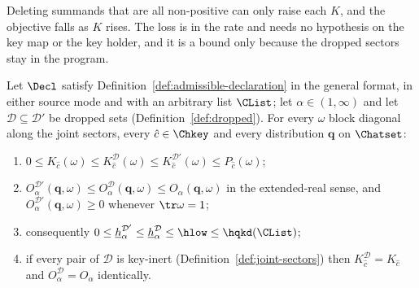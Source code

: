 
Deleting summands that are all non-positive can only raise each $K$, and
the objective falls as $K$ rises. The loss is in the rate and needs no
hypothesis on the key map or the key holder, and it is a bound only because
the dropped sectors stay in the program.

\begin{proposition}\label{prop:drop-bound}
Let $\Decl$ satisfy Definition~\ref{def:admissible-declaration} in the general format, in
either source mode and with an arbitrary list $\CList$; let
$\alpha\in(1,\infty)$ and let $\mathcal{D}\subseteq\mathcal{D}'$ be dropped
sets (Definition~\ref{def:dropped}). For every $\omega$ block diagonal along
the joint sectors, every $\hat c\in\Chkey$ and every distribution $\mathbf q$
on $\Chatset$:
\begin{enumerate}[label=(\roman*),leftmargin=2.2em]
\item $0\le K_{\hat c}(\omega)\le K^{\mathcal{D}}_{\hat c}(\omega)
\le K^{\mathcal{D}'}_{\hat c}(\omega)\le P_{\hat c}(\omega)$;
\item $O^{\mathcal{D}'}_{\alpha}(\mathbf q,\omega)\le
O^{\mathcal{D}}_{\alpha}(\mathbf q,\omega)\le O_{\alpha}(\mathbf q,\omega)$
in the extended-real sense, and $O^{\mathcal{D}'}_{\alpha}(\mathbf
q,\omega)\ge0$ whenever $\tr\omega=1$;
\item consequently
$0\le\underline{h}^{\mathcal{D}'}_{\alpha}\le
\underline{h}^{\mathcal{D}}_{\alpha}\le\hlow\le\hqkd(\CList)$;
\item if every pair of $\mathcal{D}$ is key-inert
(Definition~\ref{def:joint-sectors}) then
$K^{\mathcal{D}}_{\hat c}=K_{\hat c}$ and
$O^{\mathcal{D}}_{\alpha}=O_{\alpha}$ identically.
\end{enumerate}
\end{proposition}

